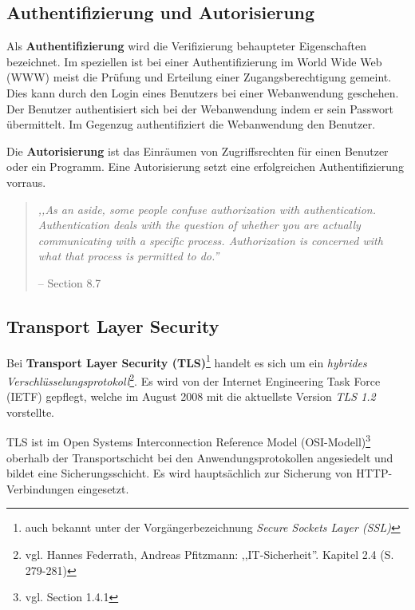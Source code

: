 \documentclass[12pt,a4paper,pointednumbers,abstracton]{scrartcl}
\begin{document}
\subsection{Authentifizierung und Autorisierung}

Als \textbf{Authentifizierung} wird die Verifizierung behaupteter Eigenschaften bezeichnet.
Im speziellen ist bei einer Authentifizierung im World Wide Web (WWW) meist die Prüfung und Erteilung einer Zugangsberechtigung gemeint.
Dies kann durch den Login eines Benutzers bei einer Webanwendung geschehen.
Der Benutzer authentisiert sich bei der Webanwendung indem er sein Passwort übermittelt.
Im Gegenzug authentifiziert die Webanwendung den Benutzer.

Die \textbf{Autorisierung} ist das Einräumen von Zugriffsrechten für einen Benutzer oder ein Programm.
Eine Autorisierung setzt eine erfolgreichen Authentifizierung vorraus.

\begin{quote}
\emph{,,As an aside, some people confuse authorization with authentication.
Authentication deals with the question of whether you are actually communicating with a specific process.
Authorization is concerned with what that process is permitted to do.''}
\begin{flushright}
\small{-- \cite{TanWet2010} Section 8.7}
\end{flushright}
\end{quote}

\subsection{Transport Layer Security}

Bei \textbf{Transport Layer Security (TLS)}\footnote{auch bekannt unter der Vorgängerbezeichnung \emph{Secure Sockets Layer (SSL)}} handelt es sich um ein \emph{hybrides Verschlüsselungsprotokoll}\footnote{vgl. \cite{WinKrö2006} Hannes Federrath, Andreas Pfitzmann: ,,IT-Sicherheit''. Kapitel 2.4 (S. 279-281)}.
Es wird von der Internet Engineering Task Force (IETF) gepflegt, welche im August 2008 mit \cite{RFC5246} die aktuellste Version \emph{TLS 1.2} vorstellte.

TLS ist im Open Systems Interconnection Reference Model (OSI-Modell)\footnote{vgl. \cite{TanWet2010} Section 1.4.1} oberhalb der Transportschicht bei den Anwendungsprotokollen angesiedelt und bildet eine Sicherungsschicht.
Es wird hauptsächlich zur Sicherung von HTTP-Verbindungen eingesetzt.
\end{document}
